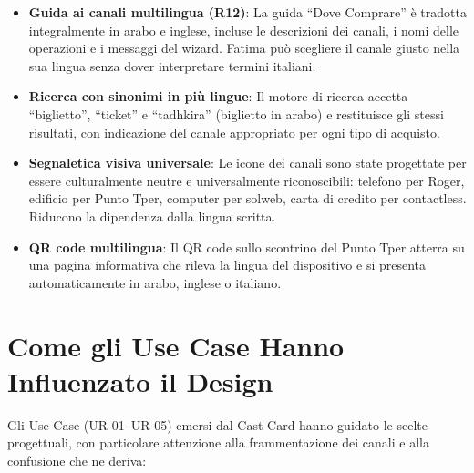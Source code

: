 \begin{itemize}
    \item \textbf{Guida ai canali multilingua (R12)}: La guida ``Dove Comprare'' \`e tradotta integralmente in arabo e inglese, incluse le descrizioni dei canali, i nomi delle operazioni e i messaggi del wizard. Fatima pu\`o scegliere il canale giusto nella sua lingua senza dover interpretare termini italiani.
    \item \textbf{Ricerca con sinonimi in pi\`u lingue}: Il motore di ricerca accetta ``biglietto'', ``ticket'' e ``tadhkira'' (biglietto in arabo) e restituisce gli stessi risultati, con indicazione del canale appropriato per ogni tipo di acquisto.
    \item \textbf{Segnaletica visiva universale}: Le icone dei canali sono state progettate per essere culturalmente neutre e universalmente riconoscibili: telefono per Roger, edificio per Punto Tper, computer per solweb, carta di credito per contactless. Riducono la dipendenza dalla lingua scritta.
    \item \textbf{QR code multilingua}: Il QR code sullo scontrino del Punto Tper atterra su una pagina informativa che rileva la lingua del dispositivo e si presenta automaticamente in arabo, inglese o italiano.
\end{itemize}

\vspace{0.3cm}

\section{Come gli Use Case Hanno Influenzato il Design}

Gli Use Case (UR-01--UR-05) emersi dal Cast Card hanno guidato le scelte progettuali, con particolare attenzione alla frammentazione dei canali e alla confusione che ne deriva:

